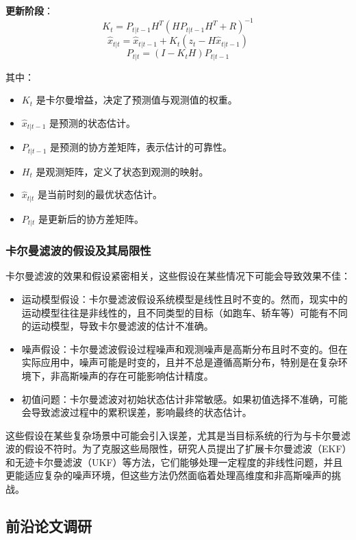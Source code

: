 \documentclass{article}
\begin{document}
\textbf{更新阶段}：
\[
    K_t = P_{t|t-1} H^T (H P_{t|t-1} H^T + R)^{-1}
\]
\[
    \hat{x}_{t|t} = \hat{x}_{t|t-1} + K_t (z_t - H \hat{x}_{t|t-1})
\]
\[
    P_{t|t} = (I - K_t H) P_{t|t-1}
\]

其中：
\begin{itemize}[itemsep=0pt]
    \item $K_t$ 是卡尔曼增益，决定了预测值与观测值的权重。
    \item $\hat{x}_{t|t-1}$ 是预测的状态估计。
    \item $P_{t|t-1}$ 是预测的协方差矩阵，表示估计的可靠性。
    \item $H_t$ 是观测矩阵，定义了状态到观测的映射。
    \item $\hat{x}_{t|t}$ 是当前时刻的最优状态估计。
    \item $P_{t|t}$ 是更新后的协方差矩阵。
\end{itemize}


\subsubsection{卡尔曼滤波的假设及其局限性}

卡尔曼滤波的效果和假设紧密相关，这些假设在某些情况下可能会导致效果不佳：

\begin{itemize}[itemsep=2pt,parsep=0pt]
    \item 运动模型假设：卡尔曼滤波假设系统模型是线性且时不变的。然而，现实中的运动模型往往是非线性的，且不同类型的目标（如跑车、轿车等）可能有不同的运动模型，导致卡尔曼滤波的估计不准确。
    \item 噪声假设：卡尔曼滤波假设过程噪声和观测噪声是高斯分布且时不变的。但在实际应用中，噪声可能是时变的，且并不总是遵循高斯分布，特别是在复杂环境下，非高斯噪声的存在可能影响估计精度。
    \item 初值问题：卡尔曼滤波对初始状态估计非常敏感。如果初值选择不准确，可能会导致滤波过程中的累积误差，影响最终的状态估计。
\end{itemize}

这些假设在某些复杂场景中可能会引入误差，尤其是当目标系统的行为与卡尔曼滤波的假设不符时。为了克服这些局限性，研究人员提出了扩展卡尔曼滤波（EKF）和无迹卡尔曼滤波（UKF）等方法，它们能够处理一定程度的非线性问题，并且更能适应复杂的噪声环境，但这些方法仍然面临着处理高维度和非高斯噪声的挑战。


\subsection{前沿论文调研}
\end{document}
